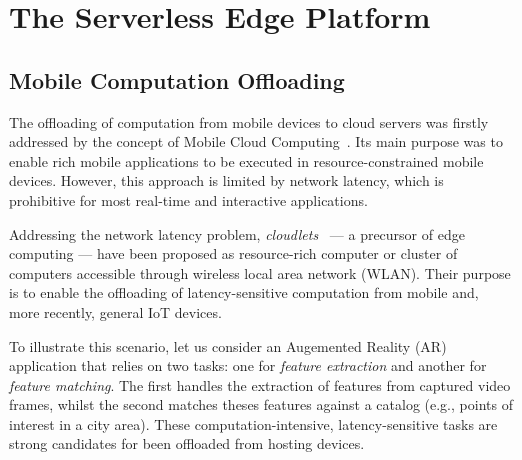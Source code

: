 \section{The Serverless Edge Platform}\label{sec:SEP}

\subsection{Mobile Computation Offloading}\label{sec:SEP_MCO}

The offloading of computation from mobile devices to cloud servers was firstly addressed by the concept of Mobile Cloud Computing~\cite{Khan:14}. Its main purpose was to enable rich mobile applications to be executed in resource-constrained mobile devices. However, this approach is limited by network latency, which is prohibitive for most real-time and interactive applications.

Addressing the network latency problem, \textit{cloudlets}~\cite{Satyanarayanan:2009} --- a precursor of edge computing --- have been proposed as resource-rich computer or cluster of computers  accessible through wireless local area network (WLAN). Their purpose is to enable the offloading of latency-sensitive computation from mobile and, more recently, general IoT devices. 


To illustrate this scenario, let us consider an Augemented Reality (AR) application that relies on two tasks: one for \textit{feature extraction} and another for \textit{feature matching}. The first handles the extraction of features from captured video frames, whilst the second matches theses features against a catalog (e.g., points of interest in a city area). 
These computation-intensive, latency-sensitive tasks are strong candidates for been offloaded from hosting devices.

